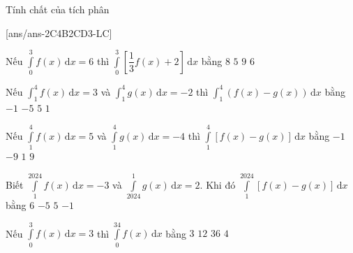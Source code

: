 \begin{dang}{Tính chất của tích phân}

\end{dang}
\setcounter{ex}{0}
\TN
{}[ans/ans-2C4B2CD3-LC]
\begin{ex}%
	Nếu $\displaystyle\int\limits_0^3f(x)\mathrm{\,d}x=6$ thì $\displaystyle\int\limits_0^3\left[\dfrac{1}{3}f(x)+2\right]\mathrm{\,d}x$ bằng
	\choice
	{\True $8$}
	{$5$}
	{$9$}
	{$6$}
\end{ex}
\begin{ex}%
	Nếu $\displaystyle\int_1^4 f(x) \mathrm{\,d}x=3$ và $\displaystyle\int_1^4 g(x) \mathrm{\,d}x=-2$ thì $\displaystyle\int_1^4\left(f(x)-g(x)\right)\mathrm{\,d}x$ bằng
	\choice
	{$-1$}
	{$-5$}
	{\True $5$}
	{$1$}
\end{ex}
\begin{ex}%
	Nếu $\displaystyle\int\limits_1^4f(x)\mathrm{\,d}x=5$ và $\displaystyle\int\limits_1^4g(x)\mathrm{\,d}x=-4$ thì $\displaystyle\int\limits_1^4\left[f(x)-g(x)\right]\mathrm{\,d}x$ bằng
	\choice
	{$-1$}
	{$-9$}
	{$1$}
	{\True $9$}
\end{ex}
\begin{ex}%
	Biết $\displaystyle\int\limits_1^{2024}f(x)\mathrm{\,d}x=-3$ và $\displaystyle\int\limits_{2024}^1g(x)\mathrm{\,d}x=2$. Khi đó $\displaystyle\int\limits_1^{2024}\left[f(x)-g(x)\right]\mathrm{\,d}x$ bằng
	\choice
	{$6$}
	{$-5$}
	{$5$}
	{\True $-1$}
\end{ex}
\begin{ex}%
	Nếu $\displaystyle\int\limits_0^3f(x)\mathrm{\,d}x=3$ thì $\displaystyle\int\limits_0^34f(x)\mathrm{\,d}x$ bằng
	\choice
	{$3$}
	{\True $12$}
	{$36$}
	{$4$}
\end{ex}
